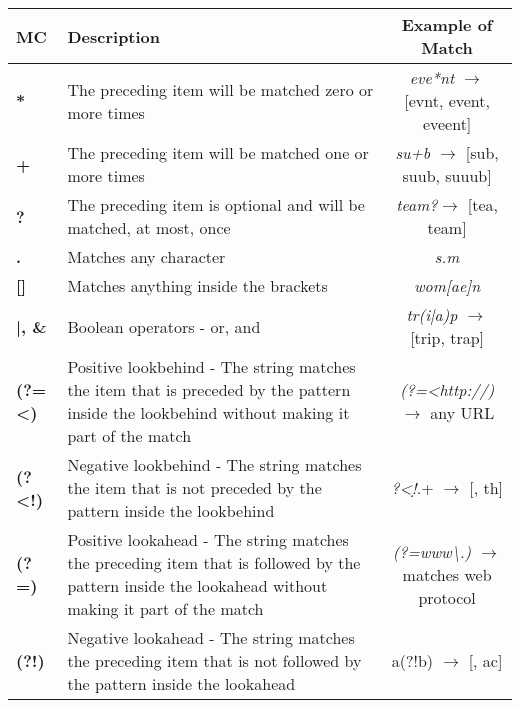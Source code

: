 \begin{table}[!h]
\centering
\renewcommand{\arraystretch}{1.25}
\begin{tabular}{ABC}
\toprule
\textbf{MC} & \textbf{Description} & \textbf{Example of Match}\\
\midrule
\textbf{*} & The preceding item will be matched zero or more times & \textit{eve*nt} $\rightarrow$ [evnt, event, eveent]\\

\textbf{+} & The preceding item will be matched one or more times & \textit{su+b} $\rightarrow$ [sub, suub, suuub]\\

\textbf{?} & The preceding item is optional and will be matched, at most, once & \textit{team?}$\rightarrow$ [tea, team]\\

\textbf{.} & Matches any character & \textit{s.m}  \\

\textbf{[]} & Matches anything inside the brackets & \textit{wom[ae]n}  \\

\textbf{|, \&} & Boolean operators - or, and & \textit{tr(i|a)p} $\rightarrow$ [trip, trap]\\

\textbf{(?=<)} & Positive lookbehind - The string matches the item that is preceded by the pattern inside the lookbehind without making it part of the match & \textit{(?=<http://)} $\rightarrow$ any URL\\

\textbf{(?<!)} & Negative lookbehind - The string matches the item that is not preceded by the pattern inside the lookbehind & \textit{?<!\d*}.+ $\rightarrow$ [, th]\\

\textbf{(?=)} & Positive lookahead - The string matches the preceding item that is followed by the pattern inside the lookahead without making it part of the match & \textit{(?=www\backslash .)} $\rightarrow$ matches web protocol\\

\textbf{(?!)} & Negative lookahead - The string matches the preceding item that is not followed by the pattern inside the lookahead & a(?!b) $\rightarrow$ [, ac]\\
\bottomrule
\end{tabular}
\end{table}

